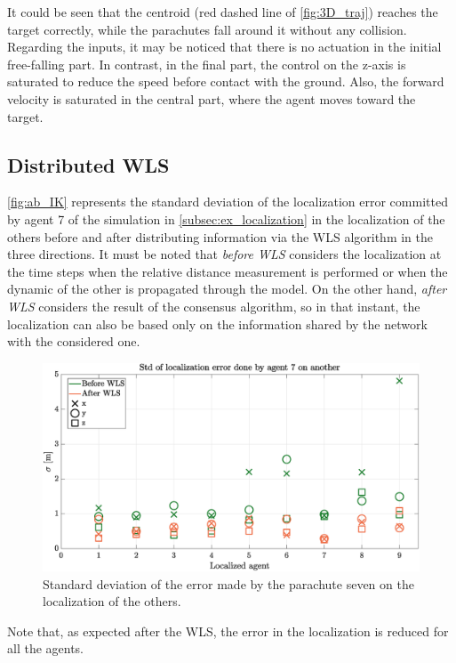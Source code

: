 It could be seen that the centroid (red dashed line of \autoref{fig:3D_traj}) reaches the target correctly, while the parachutes fall around it without any collision.\\
Regarding the inputs, it may be noticed that there is no actuation in the initial free-falling part. In contrast, in the final part, the control on the z-axis is saturated to reduce the speed before contact with the ground. Also, the forward velocity is saturated in the central part, where the agent moves toward the target. 

\subsection{Distributed WLS}
\autoref{fig:ab_IK} represents the standard deviation of the localization error committed by agent 7 of the simulation in \ref{subsec:ex_localization} in the localization of the others before and after distributing information via the WLS algorithm in the three directions. It must be noted that \textit{before WLS} considers the localization at the time steps when the relative distance measurement is performed or when the dynamic of the other is propagated through the model. On the other hand, \textit{after WLS} considers the result of the consensus algorithm, so in that instant, the localization can also be based only on the information shared by the network with the considered one.
\begin{figure}[h]
    \centering
    \includegraphics[width=\columnwidth]{images/mdl2_9chutes_be_wls.eps}
    \caption{Standard deviation of the error made by the parachute seven on the localization of the others.}
    \label{fig:ab_IK}
\end{figure}
Note that, as expected after the WLS, the error in the localization is reduced for all the agents.

